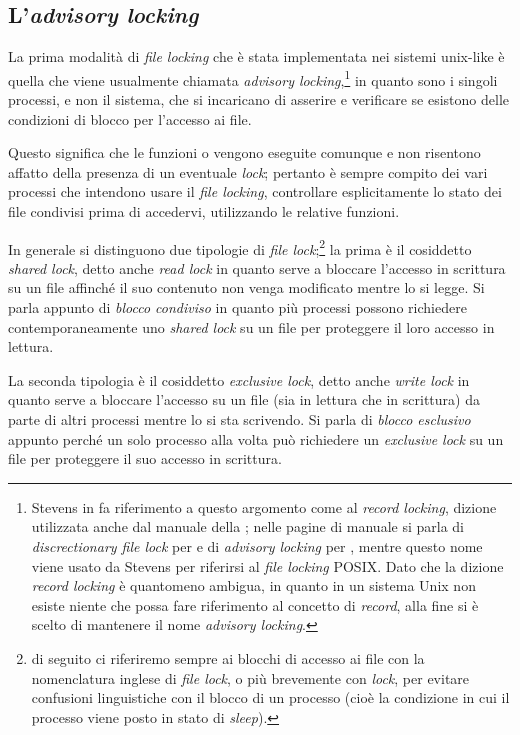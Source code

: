 \subsection{L'\textit{advisory locking}}
\label{sec:file_record_locking}

La prima modalità di \textit{file locking} che è stata implementata nei
sistemi unix-like è quella che viene usualmente chiamata \textit{advisory
  locking},\footnote{Stevens in \cite{APUE} fa riferimento a questo argomento
  come al \textit{record locking}, dizione utilizzata anche dal manuale della
  ; nelle pagine di manuale si parla di \textit{discrectionary file
    lock} per  e di \textit{advisory locking} per ,
  mentre questo nome viene usato da Stevens per riferirsi al \textit{file
    locking} POSIX. Dato che la dizione \textit{record locking} è quantomeno
  ambigua, in quanto in un sistema Unix non esiste niente che possa fare
  riferimento al concetto di \textit{record}, alla fine si è scelto di
  mantenere il nome \textit{advisory locking}.} in quanto sono i singoli
processi, e non il sistema, che si incaricano di asserire e verificare se
esistono delle condizioni di blocco per l'accesso ai file. 

Questo significa che le funzioni  o  vengono eseguite
comunque e non risentono affatto della presenza di un eventuale \textit{lock};
pertanto è sempre compito dei vari processi che intendono usare il
\textit{file locking}, controllare esplicitamente lo stato dei file condivisi
prima di accedervi, utilizzando le relative funzioni.

In generale si distinguono due tipologie di \textit{file lock};\footnote{di
  seguito ci riferiremo sempre ai blocchi di accesso ai file con la
  nomenclatura inglese di \textit{file lock}, o più brevemente con
  \textit{lock}, per evitare confusioni linguistiche con il blocco di un
  processo (cioè la condizione in cui il processo viene posto in stato di
  \textit{sleep}).} la prima è il cosiddetto \textit{shared lock}, detto anche
\textit{read lock} in quanto serve a bloccare l'accesso in scrittura su un
file affinché il suo contenuto non venga modificato mentre lo si legge. Si
parla appunto di \textsl{blocco condiviso} in quanto più processi possono
richiedere contemporaneamente uno \textit{shared lock} su un file per
proteggere il loro accesso in lettura.

La seconda tipologia è il cosiddetto \textit{exclusive lock}, detto anche
\textit{write lock} in quanto serve a bloccare l'accesso su un file (sia in
lettura che in scrittura) da parte di altri processi mentre lo si sta
scrivendo. Si parla di \textsl{blocco esclusivo} appunto perché un solo
processo alla volta può richiedere un \textit{exclusive lock} su un file per
proteggere il suo accesso in scrittura.

